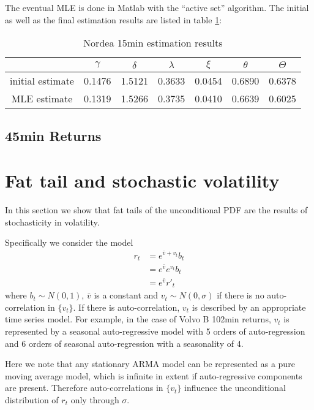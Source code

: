\documentclass{book}
\begin{document}
The eventual MLE is done in Matlab with the ``active set''
algorithm. The initial as well as the final estimation results are
listed in table \ref{tab:nordea_15min_js_param}:
\begin{table}[htb!]
  \centering
  \begin{tabular}{c|c|c|c|c|c|c}
    & $\gamma$ & $\delta$ & $\lambda$ & $\xi$ & $\theta$ & $\Theta$ \\
    \hline
    initial estimate & 0.1476 & 1.5121 & 0.3633 & 0.0454 & 0.6890 &
    0.6378 \\
    \hline
    MLE estimate & 0.1319 & 1.5266 & 0.3735 & 0.0410 & 0.6639 & 0.6025
  \end{tabular}
  \caption{\footnotesize Nordea 15min estimation results}
  \label{tab:nordea_15min_js_param}
\end{table}

\subsection{45min Returns}
\section{Fat tail and stochastic volatility}
In this section we show that fat tails of the unconditional PDF are
the results of stochasticity in volatility.

Specifically we consider the model
\begin{equation}  \label{eq:UnconditionalPdf}
  \begin{aligned}
    r_t &= e^{\bar{v} + v_t} b_t \\
    &= e^{\bar{v}} e^{v_t} b_t \\
    &= e^{\bar{v}} r'_t
  \end{aligned}
\end{equation}
where $b_t \sim N(0, 1)$, $\bar{v}$ is a constant and $v_t \sim N(0,
\sigma)$ if there is no auto-correlation in $\{v_t\}$. If there is
auto-correlation, $v_t$ is described by an appropriate time series
model. For example, in the case of Volvo B 102min returns, $v_t$ is
represented by a seasonal auto-regressive model with 5 orders of
auto-regression and 6 orders of seasonal auto-regression with a
seasonality of 4.

Here we note that any stationary ARMA model can be represented as a
pure moving average model, which is infinite in extent if
auto-regressive components are present. Therefore auto-correlations in
$\{v_t\}$ influence the unconditional distribution of $r_t$ only
through $\sigma$.
\end{document}
